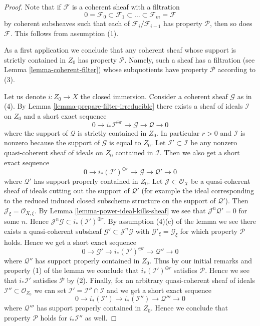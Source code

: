 \documentclass{stacks-project}
\theoremstyle{plain}
\theoremstyle{definition}
\theoremstyle{remark}
\numberwithin{equation}{subsection}
\begin{document}
\begin{proof}
Note that if $\mathcal{F}$ is a coherent sheaf with a filtration
$$
0 = \mathcal{F}_0 \subset \mathcal{F}_1 \subset
\ldots \subset \mathcal{F}_m = \mathcal{F}
$$
by coherent subsheaves such that each of $\mathcal{F}_i/\mathcal{F}_{i - 1}$
has property $\mathcal{P}$, then so does $\mathcal{F}$.
This follows from assumption (1).

\medskip\noindent
As a first application we conclude that any coherent sheaf whose support
is strictly contained in $Z_0$ has property $\mathcal{P}$. Namely, such a
sheaf has a filtration (see Lemma \ref{lemma-coherent-filter})
whose subquotients have property $\mathcal{P}$ according to (3).

\medskip\noindent
Let us denote $i : Z_0 \to X$ the closed immersion.
Consider a coherent sheaf $\mathcal{G}$ as in (4).
By Lemma \ref{lemma-prepare-filter-irreducible}
there exists a sheaf of ideals $\mathcal{I}$ on $Z_0$ and
a short exact sequence
$$
0 \to
i_*\mathcal{I}^{\oplus r} \to
\mathcal{G} \to
\mathcal{Q} \to 0
$$
where the support of $\mathcal{Q}$ is strictly contained in $Z_0$.
In particular $r > 0$ and $\mathcal{I}$ is nonzero
because the support of $\mathcal{G}$ is equal to $Z_0$.
Let $\mathcal{I}' \subset \mathcal{I}$ be any nonzero quasi-coherent
sheaf of ideals on $Z_0$ contained in $\mathcal{I}$.
Then we also get a short exact sequence
$$
0 \to
i_*(\mathcal{I}')^{\oplus r} \to
\mathcal{G} \to
\mathcal{Q}' \to 0
$$
where $\mathcal{Q}'$ has support properly contained in $Z_0$.
Let $\mathcal{J} \subset \mathcal{O}_X$ be a quasi-coherent sheaf
of ideals cutting out the support of $\mathcal{Q}'$ (for example
the ideal corresponding to the reduced induced closed subscheme
structure on the support of $\mathcal{Q}'$). Then
$\mathcal{J}_\xi = \mathcal{O}_{X, \xi}$. By
Lemma \ref{lemma-power-ideal-kills-sheaf}
we see that $\mathcal{J}^n\mathcal{Q}' = 0$ for some $n$.
Hence $\mathcal{J}^n\mathcal{G} \subset i_*(\mathcal{I}')^{\oplus r}$.
By assumption (4)(c) of the lemma we see there exists
a quasi-coherent subsheaf $\mathcal{G}' \subset \mathcal{J}^n\mathcal{G}$
with $\mathcal{G}'_\xi = \mathcal{G}_\xi$
for which property $\mathcal{P}$ holds.
Hence we get a short exact sequence
$$
0 \to \mathcal{G}' \to
i_*(\mathcal{I}')^{\oplus r} \to
\mathcal{Q}'' \to 0
$$
where $\mathcal{Q}''$ has support properly contained in $Z_0$.
Thus by our initial remarks and property (1) of the lemma
we conclude that $i_*(\mathcal{I}')^{\oplus r}$ satisfies
$\mathcal{P}$. Hence we see that $i_*\mathcal{I}'$ satisfies
$\mathcal{P}$ by (2). Finally, for an arbitrary quasi-coherent
sheaf of ideals $\mathcal{I}'' \subset \mathcal{O}_{Z_0}$ we can set
$\mathcal{I}' = \mathcal{I}'' \cap \mathcal{I}$ and we get
a short exact sequence
$$
0 \to
i_*(\mathcal{I}') \to
i_*(\mathcal{I}'') \to
\mathcal{Q}''' \to 0
$$
where $\mathcal{Q}'''$ has support properly contained in $Z_0$.
Hence we conclude that property $\mathcal{P}$ holds for
$i_*\mathcal{I}''$ as well.


\end{proof}
\end{document}
